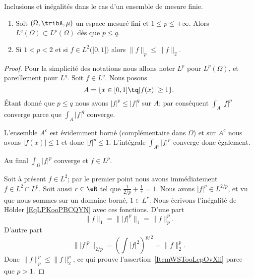 \begin{proposition} \label{PropIRDooFSWORl}
    Inclusions et inégalités dans le cas d'un ensemble de mesure finie.
    \begin{enumerate}
        \item
            Soit \( (\Omega,\tribA,\mu)\) un espace mesuré fini et \( 1\leq p\leq +\infty\). Alors \( L^q(\Omega)\subset L^p(\Omega)\) dès que \( p\leq q\).
        \item   \label{ItemWSTooLcpOvXii}
            Si \( 1<p<2\) et si \( f\in L^2\big( \mathopen[ 0 , 1 \mathclose] \big)\) alors \( \| f \|_p\leq \| f \|_2\).
    \end{enumerate}
\end{proposition}
\begin{proof}
    Pour la simplicité des notations nous allons noter \( L^p\) pour \( L^p(\Omega)\), et pareillement pour \( L^q\). Soit \( f\in L^q\). Nous posons
    \begin{equation}
        A=\{ x\in\mathopen[ 0 , 1 \mathclose]\tq | f(x) |\geq 1 \}.
    \end{equation}
    Étant donné que \( p\leq q\) nous avons \( | f |^p\leq | f |^q\) sur \( A\); par conséquent \( \int_A| f |^p\) converge parce que \( \int_A| f |^q\) converge.

    L'ensemble \( A^c\) est évidemment borné (complémentaire dans \(  \Omega \)) et sur \( A^c\) nous avons \( | f(x) |\leq 1\) et donc \( | f |^p\leq 1\). L'intégrale \( \int_{A^c}| f |^p\) converge donc également.

    Au final \( \int_{\Omega}| f |^p\) converge et \( f\in L^p\).


    Soit à présent \( f\in L^2\); par le premier point nous avons immédiatement \( f\in L^2\cap L^p\). Soit aussi \( r\in \eR\) tel que \( \frac{1}{ 2/p }+\frac{1}{ r }=1\). Nous avons \( | f |^p\in L^{2/p}\), et vu que nous sommes sur un domaine borné, \( 1\in L^r\). Nous écrivons l'inégalité de Hölder \eqref{EqLPKooPBCQYN} avec ces fonctions. D'une part
    \begin{equation}
        \| f \|_1=\| | f |^p \|_1=\| f \|_p^p.
    \end{equation}
    D'autre part
    \begin{equation}
        \| | f |^p \|_{2/p}=\left( \int| f |^2 \right)^{p/2}=\| f \|_2^p.
    \end{equation}
    Donc \( \| f \|_p^p\leq \| f \|_2^p\), ce qui prouve l'assertion~\ref{ItemWSTooLcpOvXii} parce que \( p>1\).
\end{proof}

